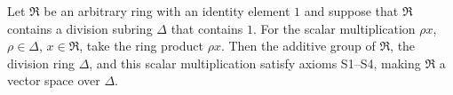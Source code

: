 Let $\mathfrak{R}$ be an arbitrary ring with an identity element $1$ and suppose that $\mathfrak{R}$ contains a division subring $\Delta$ that contains $1$. For the scalar multiplication $\rho x$, $\rho \in \Delta$, $x \in \mathfrak{R}$, take the ring product $\rho x$. Then the additive group of $\mathfrak{R}$, the division ring $\Delta$, and this scalar multiplication satisfy axioms S1--S4, making $\mathfrak{R}$ a vector space over $\Delta$.

